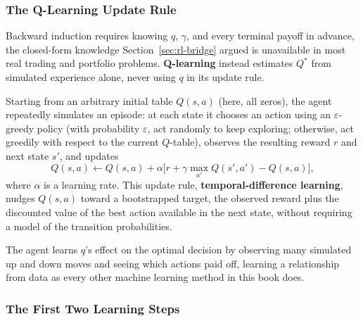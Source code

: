 \documentclass[../ai_in_finance]{subfiles}
\begin{document}
\subsubsection*{The Q-Learning Update Rule}

Backward induction requires knowing $q$, $\gamma$, and every terminal payoff in advance, the closed-form knowledge Section~\ref{sec:rl-bridge} argued is unavailable in most real trading and portfolio problems. \textbf{Q-learning} instead estimates $Q^*$ from simulated experience alone, never using $q$ in its update rule.

Starting from an arbitrary initial table $Q(s,a)$ (here, all zeros), the agent repeatedly simulates an episode: at each state it chooses an action using an $\varepsilon$-greedy policy (with probability $\varepsilon$, act randomly to keep exploring; otherwise, act greedily with respect to the current $Q$-table), observes the resulting reward $r$ and next state $s'$, and updates
\begin{equation}
Q(s,a) \leftarrow Q(s,a) + \alpha\Big[r + \gamma \max_{a'} Q(s',a') - Q(s,a)\Big],
\label{eq:rl-qlearning-update}
\end{equation}
where $\alpha$ is a learning rate. This update rule, \textbf{temporal-difference learning}, nudges $Q(s,a)$ toward a bootstrapped target, the observed reward plus the discounted value of the best action available in the next state, without requiring a model of the transition probabilities.

The agent learns $q$'s effect on the optimal decision by observing many simulated up and down moves and seeing which actions paid off, learning a relationship from data as every other machine learning method in this book does.

\subsubsection*{The First Two Learning Steps}
\end{document}
